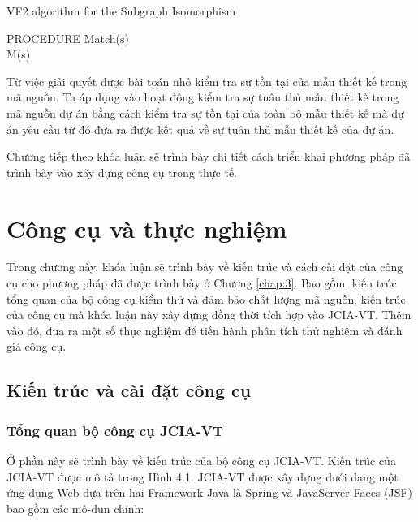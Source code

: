 \documentclass[12pt]{report}
\newenvironment{thuattoan}[1][h]
  {\renewcommand{\algorithmcfname}{Thuật toán}
   \begin{algorithm}[#1]
  }{\end{algorithm}}
\begin{document}
\begin{thuattoan}[!htbp]
	\caption{VF2 algorithm for the Subgraph Isomorphism}
	PROCEDURE Match(s)\\
	\Return M(s)\;
	
	\label{algo:VF2}
\end{thuattoan}


\noindent Từ việc giải quyết được bài toán nhỏ kiểm tra sự tồn tại của mẫu thiết kế trong mã nguồn. Ta áp dụng vào hoạt động kiểm tra sự tuân thủ mẫu thiết kế trong mã nguồn dự án bằng cách kiểm tra sự tồn tại của toàn bộ mẫu thiết kế mà dự án yêu cầu từ đó đưa ra được kết quả về sự tuân thủ mẫu thiết kế của dự án. 

\noindent Chương tiếp theo khóa luận sẽ trình bày chi tiết cách triển khai phương pháp đã trình bày vào xây dựng công cụ trong thực tế.
\chapter{Công cụ và thực nghiệm}
\label{chap:4}
Trong chương này, khóa luận sẽ trình bày về kiến trúc và cách cài đặt của công cụ cho phương pháp đã được trình bày ở Chương \ref{chap:3}. Bao gồm, kiến trúc tổng quan của bộ công cụ kiểm thử và đảm bảo chất lượng mã nguồn, kiến trúc của công cụ mà khóa luận này xây dựng đồng thời tích hợp vào JCIA-VT. Thêm vào đó, đưa ra một số thực nghiệm để tiến hành phân tích thử nghiệm và đánh giá công cụ.

\section{Kiến trúc và cài đặt công cụ}
\subsection{Tổng quan bộ công cụ JCIA-VT}
Ở phần này sẽ trình bày về kiến trúc của bộ công cụ JCIA-VT. Kiến trúc của JCIA-VT được mô tả trong Hình 4.1. JCIA-VT được xây dựng dưới dạng một ứng dụng Web dựa trên hai Framework Java là Spring và JavaServer Faces (JSF) bao gồm các mô-đun chính:
\end{document}
